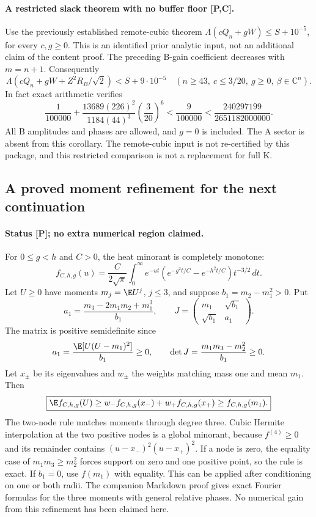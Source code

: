 \paragraph{A restricted slack theorem with no buffer floor [P,C].}
Use the previously established remote-cubic theorem
\(\Lambda(cQ_n+gW)\le S+10^{-5}\), for every \(c,g\ge0\).
This is an identified prior analytic input, not an additional claim
of the content proof.  The preceding B-gain coefficient decreases
with \(m=n+1\).  Consequently
\[
\boxed{\Lambda(cQ_n+gW+Z^2R_B/\sqrt2)<S+9\cdot10^{-5}
\quad(n\ge43,\ c\le3/20,\ g\ge0,\ \beta\in\mathbb C^n).}
\]
In fact exact arithmetic verifies
\[
\frac1{100000}+
\frac{13689(226)^2}{1184(44)^3}\left(\frac3{20}\right)^6
<\frac9{100000}
<\frac{240297199}{2651182000000}.
\]
All B amplitudes and phases are allowed, and \(g=0\) is included.
The A sector is absent from this corollary.  The remote-cubic
input is not re-certified by this package, and this restricted
comparison is not a replacement for full K.

\subsection{A proved moment refinement for the next continuation}
\paragraph{Status [P]; no extra numerical region claimed.}
For $0\le g<h$ and $C>0$, the heat minorant is completely monotone:
\[
 f_{C,h,g}(u)=\frac{C}{2\sqrt\pi}\int_0^\infty e^{-ut}
 (e^{-g^2t/C}-e^{-h^2t/C})t^{-3/2}\,dt.
\]
Let $U\ge0$ have moments $m_j=\E U^j$, $j\le3$, and suppose
$b_1=m_2-m_1^2>0$. Put
\[
 a_1=\frac{m_3-2m_1m_2+m_1^3}{b_1},\qquad
 J=\begin{pmatrix}m_1&\sqrt{b_1}\\ \sqrt{b_1}&a_1\end{pmatrix}.
\]
The matrix is positive semidefinite since
\[
 a_1=\frac{\E[U(U-m_1)^2]}{b_1}\ge0,\qquad
 \det J=\frac{m_1m_3-m_2^2}{b_1}\ge0.
\]
Let $x_\pm$ be its eigenvalues and $w_\pm$ the weights matching
mass one and mean $m_1$. Then
\[
 \boxed{\E f_{C,h,g}(U)\ge
 w_-f_{C,h,g}(x_-)+w_+f_{C,h,g}(x_+)
 \ge f_{C,h,g}(m_1).}
\]
The two-node rule matches moments through degree three. Cubic Hermite
interpolation at the two positive nodes is a global minorant, because
$f^{(4)}\ge0$ and its remainder contains
$(u-x_-)^2(u-x_+)^2$. If a node is zero, the equality case of
$m_1m_3\ge m_2^2$ forces support on zero and one positive point, so
the rule is exact. If $b_1=0$, use $f(m_1)$ with equality.
This can be applied after conditioning on one or both radii. The
companion Markdown proof gives exact Fourier formulas for the three
moments with general relative phases. No numerical gain from this
refinement has been claimed here.

